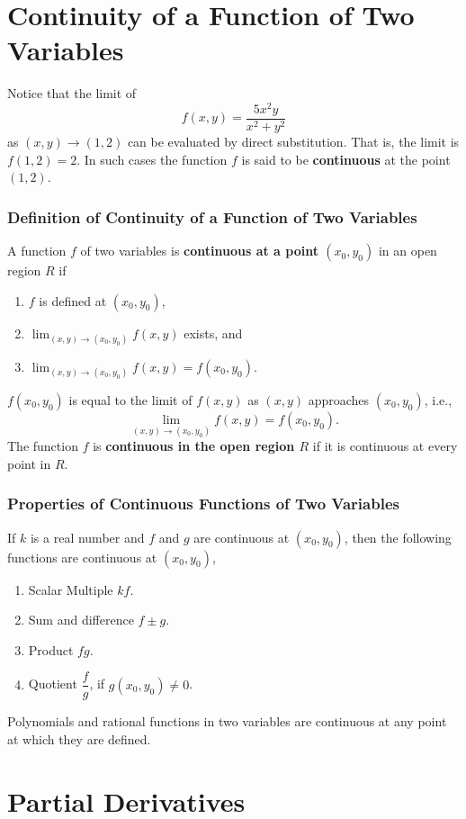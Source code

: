 \documentclass[titlepage,a4paper,12pt]{report}
\begin{document}
 \section{Continuity of a Function of Two Variables}
 Notice that the limit of 
 \[f(x,y)=\dfrac{5x^2y}{x^2+y^2}\] as $(x,y)\rightarrow (1,2)$ can be evaluated by direct substitution. That is, the limit is $f(1,2)=2$. In such cases the function $f$ is said to be \textbf{continuous} at the point $(1,2)$.
 \subsubsection{Definition of Continuity of a Function of Two Variables}
 A function $f$ of two variables is \textbf{continuous at a point $(x_0,y_0)$} in an open region $R$ if
 \begin{enumerate}
 \item $f$ is defined at $(x_0,y_0)$,
 \item $\displaystyle \lim _{(x,y)\rightarrow (x_0,y_0)}f(x,y)$ exists, and 
 \item $\displaystyle \lim _{(x,y)\rightarrow (x_0,y_0)}f(x,y)=f(x_0,y_0).$
\end{enumerate}  
$f(x_0,y_0)$ is equal to the limit of $f(x,y)$ as $(x,y)$ approaches $(x_0,y_0)$, i.e., 
 \[\lim _{(x,y)\rightarrow (x_0,y_0)}f(x,y)=f(x_0,y_0).\] 
 The function $f$ is \textbf{continuous in the open region $R$} if it is continuous at every point in $R$.
 \subsubsection{Properties of Continuous Functions of Two Variables}
 If $k$ is a real number and $f$ and $g$ are continuous at $(x_0,y_0)$, then the following functions are continuous at $(x_0,y_0)$, 
 \begin{enumerate}
 \item Scalar Multiple $kf$.
 \item Sum and difference $f\pm g$. 
 \item Product $fg$.
 \item Quotient $\dfrac{f}{g}$, if $g(x_0,y_0)\neq 0$.
 \end{enumerate}
 Polynomials and rational functions in two variables are continuous at any point at which they are defined.
\section{Partial Derivatives}
\end{document}
